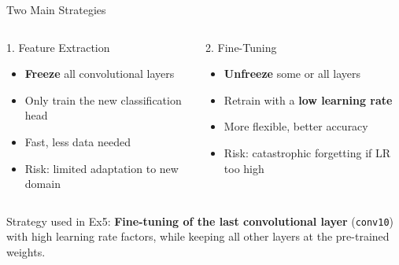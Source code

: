 \documentclass[aspectratio=169,xcolor=dvipsnames]{beamer}
\begin{document}
\begin{frame}{Two Main Strategies}
    \begin{columns}
        \begin{block}{1. Feature Extraction}
            \begin{itemize}
                \item \textbf{Freeze} all convolutional layers
                \item Only train the new classification head
                \item Fast, less data needed
                \item Risk: limited adaptation to new domain
            \end{itemize}
        \end{block}
        \begin{block}{2. Fine-Tuning}
            \begin{itemize}
                \item \textbf{Unfreeze} some or all layers
                \item Retrain with a \textbf{low learning rate}
                \item More flexible, better accuracy
                \item Risk: catastrophic forgetting if LR too high
            \end{itemize}
        \end{block}
    \end{columns}

    \begin{exampleblock}{Strategy used in Ex5:}
        \textbf{Fine-tuning of the last convolutional layer} (\texttt{conv10}) with high learning rate factors, while keeping all other layers at the pre-trained weights.
    \end{exampleblock}
\end{frame}
\end{document}
